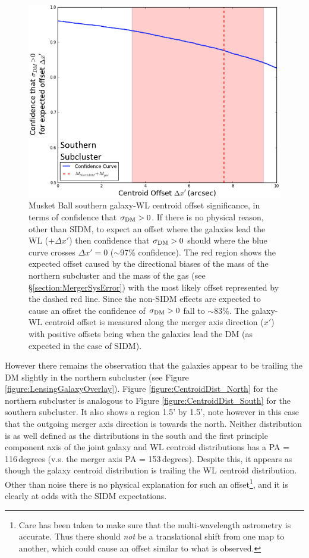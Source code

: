 \begin{figure}
\centering
\includegraphics[width=5in]{Chapter4/AnalysisFiles/GalDenVsHSTWL_pzpen_delxPC_south_reformat.png}
\caption[Musket Ball southern subcluster galaxy and weak lensing centroid offset significance.]{
Musket Ball southern galaxy-WL centroid offset significance, in terms of confidence that $\sigma_{\rm DM}>0$.
If there is no physical reason, other than SIDM, to expect an offset where the galaxies lead the WL ($+\Delta x'$) then confidence that $\sigma_{\rm DM}>0$ should where the blue curve crosses $\Delta x'=0$ ($\sim$97\% confidence).
The red region shows the expected offset caused by the directional biases of the mass of the northern subcluster and the mass of the gas (see \S\ref{section:MergerSysError}) with the most likely offset represented by the dashed red line.
Since the non-SIDM effects are expected to cause an offset the confidence of $\sigma_{\rm DM}>0$ fall to $\sim$83\%.
The galaxy-WL centroid offset is measured along the merger axis direction ($x'$) with positive offsets being when the galaxies lead the DM (as expected in the case of SIDM).
}
\label{figure:CentroidSignificance_South}
\end{figure}

However there remains the observation that the galaxies appear to be trailing the DM slightly in the northern subcluster (see Figure \ref{figure:LensingGalaxyOverlay}).
Figure \ref{figure:CentroidDist_North} for the northern subcluster is analogous to Figure \ref{figure:CentroidDist_South} for the southern subcluster.
It also shows a region 1.5' by 1.5', note however in this case that the outgoing merger axis direction is towards the north.
Neither distribution is as well defined as the distributions in the south and the first principle component axis of the joint galaxy and WL centroid distributions has a PA = 116\,degrees (v.s. the merger axis PA = 153\,degrees).
Despite this, it appears as though the galaxy centroid distribution is trailing the WL centroid distribution.
Other than noise there is no physical explanation for such an offset\footnote{Care has been taken to make sure that the multi-wavelength astrometry is accurate. Thus there should \textit{not} be a translational shift from one map to another, which could cause an offset similar to what is observed.}, and it is clearly at odds with the SIDM expectations.

